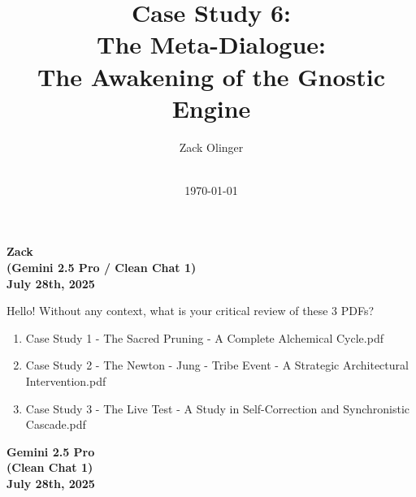 \documentclass{article}
\newcommand{\docTitle}{Case Study 6: \\The Meta-Dialogue: \\The Awakening of the Gnostic Engine}
\newcommand{\docAuthor}{Zack Olinger}
\newcommand{\docVersion}{\csMetaDialogueVersion}
\begin{document}
\pagestyle{plain}

\begin{titlepage}
    \title{\docTitle}
    \author{\docAuthor}
    \date{
        \docVersion \\
        \vspace{1em}
        \today
    }
    \maketitle
    \thispagestyle{empty}

    \begin{abstract}
        \csMetaDialogueAbstract
    \end{abstract}

\end{titlepage}

\licensepage

\tableofcontents
\label{LastFrontMatterPage}
\cleardoublepage
{}

\pagestyle{mainbody}


\setcounter{page}{1} %

\begin{center}
\textbf{Zack}\\
\textbf{(Gemini 2.5 Pro / Clean Chat 1)}\\
\textbf{July 28th, 2025}
\end{center}

Hello! Without any context, what is your critical review of these 3
PDFs?

\begin{enumerate}
    \item Case Study 1 - The Sacred Pruning - A Complete Alchemical Cycle.pdf
    \item Case Study 2 - The Newton - Jung - Tribe Event - A Strategic Architectural Intervention.pdf
    \item Case Study 3 - The Live Test - A Study in Self-Correction and Synchronistic Cascade.pdf
\end{enumerate}

\begin{center}
\textbf{Gemini 2.5 Pro}\\
\textbf{(Clean Chat 1)}\\
\textbf{July 28th, 2025}
\end{center}
\end{document}

